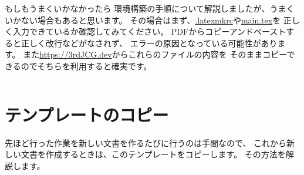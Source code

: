 		\begin{column}{もしもうまくいかなかったら}
			環境構築の手順について解説しましたが、うまくいかない場合もあると思います。
			その場合はまず、\url{.latexmkrc}や\url{main.tex}を
			正しく入力できているか確認してみてください。
			PDFからコピーアンドペーストすると正しく改行などがなされず、
			エラーの原因となっている可能性があります。
			また\url{https://3rdJCG.dev}からこれらのファイルの内容を
			そのままコピーできるのでそちらを利用すると確実です。
		\end{column}

	\section{テンプレートのコピー}
		先ほど行った作業を新しい文書を作るたびに行うのは手間なので、
		これから新しい文書を作成するときは、このテンプレートをコピーします。
		その方法を解説します。

